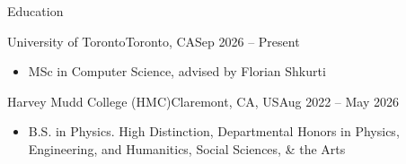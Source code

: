 \documentclass[]{mcdowellcv}
\begin{document}
\makeheader

\vspace{-0.1in}

\begin{cvsection}{Education}
	\begin{cvsubsection}{University of Toronto}{Toronto, CA}{Sep 2026 -- Present}
		\begin{itemize}
			\item MSc in Computer Science, advised by Florian Shkurti
		\end{itemize}
	\end{cvsubsection}
	\begin{cvsubsection}{Harvey Mudd College (HMC)}{Claremont, CA, US}{Aug 2022 -- May 2026}
		\begin{itemize}
			\item B.S. in Physics. High Distinction, Departmental Honors in Physics, Engineering, and Humanitics, Social Sciences, \& the Arts
		\end{itemize}
	\end{cvsubsection}
\end{cvsection}

\vspace{-0.5em}
\end{document}
